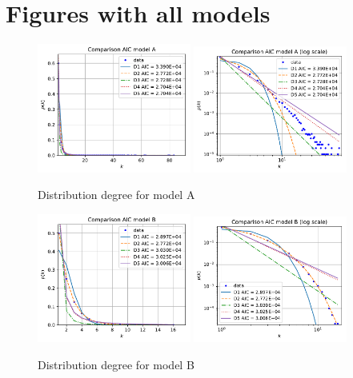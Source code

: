 \documentclass[a4paper]{article}
\begin{document}
\newpage
\section{Figures with all models}

\begin{figure}[H]
		\centering
		\includegraphics[width=0.45\textwidth]{modelA/all_dd.pdf}
		\includegraphics[width=0.45\textwidth]{modelA/all_log_dd.pdf}
		\caption{Distribution degree for model A}
		\label{fig:all_dd_A}
\end{figure}
%
\begin{figure}[H]
		\centering
		\includegraphics[width=0.45\textwidth]{modelB/all_dd.pdf}
		\includegraphics[width=0.45\textwidth]{modelB/all_log_dd.pdf}
		\caption{Distribution degree for model B}
		\label{fig:all_dd_B}
\end{figure}
\end{document}
